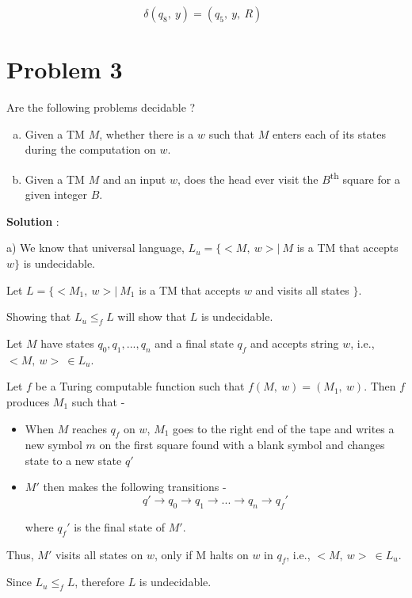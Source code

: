 \documentclass{article}
\begin{document}
    $~~~~~~~~~~~~~~~~~~~~~~~~~~~~~~~~~~~~~~~~~~~~~~~~~~~~~~~~\delta(q_8,~y)=(q_5,~y,~R)$
    
    
    \section*{Problem 3} Are the following problems decidable ?
    
    \begin{enumerate}[(a)]
        \item Given a TM $M$, whether there is a $w$ such that $M$ enters each of its states during the computation on $w$.
        \item Given a TM $M$ and an input $w$, does the head ever visit the $B$\textsuperscript{th} square for a given integer $B$.
    \end{enumerate}
    
    \textbf{Solution} :
    
    a) We know that universal language, $L_{u} = \{<M, ~w>|~ M$ is a TM that accepts $w\}$ is undecidable. 
    
    \quad Let $L = \{<M_{1}, ~w>| ~M_{1}$ is a TM that accepts $w$ and visits all states $\}$. 
    
    \quad Showing that $L_{u} \le_{f} L$ will show that $L$ is undecidable.
    
    \quad Let $M$ have states $q_{0}, q_{1}, ..., q_{n}$ and a final state $q_{f}$ and accepts string $w$, i.e., $<M, ~w> ~\in L_{u}$. 
    
    \quad Let $f$ be a Turing computable function such that $f(M, ~w) = (M_{1}, ~w)$. Then $f$ produces $M_{1}$ such that -
    \begin{itemize}
        \item When $M$ reaches $q_{f}$ on $w$, $M_{1}$ goes to the right end of the tape and writes a new symbol $m$ on the first square found with a blank symbol and changes state to a new state $q'$
        \item $M'$ then makes the following transitions -
        $$ q' \rightarrow q_{0} \rightarrow q_{1} \rightarrow ... \rightarrow q_{n} \rightarrow q_{f}' $$
        
        where $q_{f}'$ is the final state of $M'$.
    \end{itemize}
    
    \quad Thus, $M'$ visits all states on $w$, only if M halts on $w$ in $q_{f}$, i.e., $<M, ~w>~ \in L_{u}$. 
    
    \quad Since  $L_{u} \le_{f} L$, therefore $L$ is undecidable. \\
    
\end{document}

